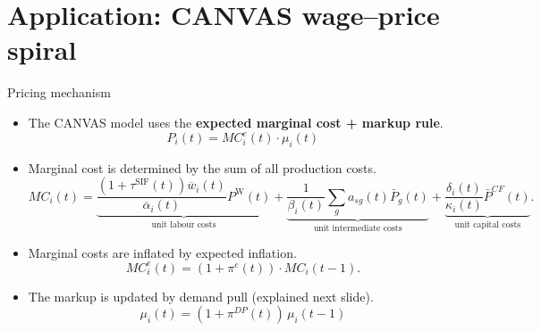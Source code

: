 \documentclass[9pt]{beamer}
\begin{document}
\section{Application: CANVAS wage--price spiral}

\begin{frame}{Pricing mechanism}
    \begin{itemize}
        \item The CANVAS model uses the \textbf{expected marginal cost + markup rule}.
        \[ P_i(t) = MC^e_i(t)\cdot\mu_i(t) \]
        \item Marginal cost is determined by the sum of all production costs.
        \[ MC_i(t) =\underbrace{\frac{(1+\tau^{\text{SIF}}(t))\overline{w}_i(t)}{\overline{\alpha}_i(t)} P^{\text{W}}(t)}_{\text{unit labour costs}} + \underbrace{\frac{1}{\beta_i(t)}\sum_g a_{s g}(t) \bar{P}_g(t)}_{\text{unit intermediate costs}} + \underbrace{\frac{\delta_i(t)}{\kappa_i(t)} \bar{P}^{C F}(t)}_{\text{unit capital costs}}. \]
        \item Marginal costs are inflated by expected inflation.
        \[ MC^e_i(t) = (1 + \pi^e(t))\cdot MC_i(t-1). \]
        \item The markup is updated by demand pull (explained next slide).
        \[ \mu_i(t) = (1 + \pi^{DP}(t))\,\mu_i(t-1) \]
    \end{itemize}
\end{frame}
\end{document}
